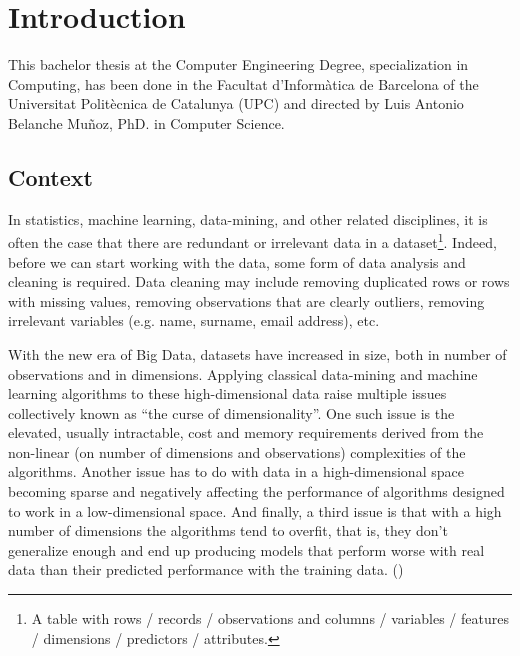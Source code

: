 
\chapter{Introduction} %

\label{Chapter1} %


This bachelor thesis at the Computer Engineering Degree, specialization in Com\-puting, has been done in the Facultat d’Informàtica de Barcelona of the Universitat Politècnica de Catalunya (UPC) and directed by Luis Antonio Belanche Muñoz, PhD. in Computer Science.

\section{Context}
\label{sec:context}

In statistics, machine learning, data-mining, and other related disciplines, it is often the case that there are redundant or irrelevant data in a dataset\footnote{A table with rows / records / observations and columns / variables / features / dimensions / predictors / attributes.}. Indeed, before we can start working with the data, some form of data analysis and cleaning is required. Data cleaning may include removing duplicated rows or rows with missing values, removing observations that are clearly outliers, removing irrelevant variables (e.g. name, surname, email address), etc.

With the new era of Big Data, datasets have increased in size, both in number of observations and in dimensions. Applying classical data-mining and machine learning algorithms to these high-dimensional data raise multiple issues collectively known as “the curse of dimensionality”. One such issue is the elevated, usually intractable, cost and memory requirements derived from the non-linear (on number of dimensions and observations) complexities of the algorithms. Another issue has to do with data in a high-dimensional space becoming sparse and negatively af\-fect\-ing the performance of algorithms designed to work in a low-dimensional space. And finally, a third issue is that with a high number of dimensions the algorithms tend to overfit, that is, they don't generalize enough and end up producing models that perform worse with real data than their predicted performance with the training data. (\cite{li_feature_2017})


